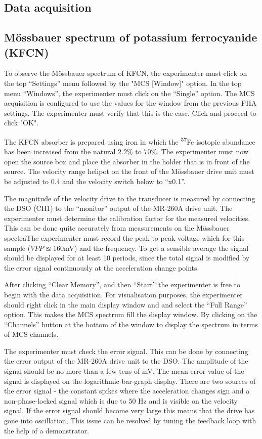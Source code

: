 \documentclass[a4paper, twocolumn]{article}
\begin{document}
\subsection{Data acquisition}
\subsection{Mössbauer spectrum of potassium ferrocyanide (KFCN)}
To observe the Mössbauer spectrum of KFCN, the experimenter must click on the top “Settings” menu followed by the "MCS [Window]" option.
In the top menu “Windows”, the experimenter must click on the “Single” option. The MCS acquisition is configured to use the values for the window from the previous PHA settings\cite{0}. The experimenter must verify that this is the case. Click and proceed to click "OK".

The KFCN absorber is prepared using iron in which the \textsuperscript{57}Fe isotopic abundance has been increased from the natural $2.2\%$ to $70\%$\cite{0}. 
The experimenter must now open the source box and place the absorber in the holder that is in front of the source\cite{0}. The velocity range helipot on the front of the Mössbauer drive unit must be adjusted to 0.4 and the velocity switch below to “x0.1”\cite{0}. 

The magnitude of the velocity drive to the transducer is measured by connecting the DSO (CH1) to the “monitor” output of the MR-260A drive unit\cite{0}. The experimenter must determine the calibration factor for the measured velocities. This can be done quite accurately from measurements on the Mössbauer spectra\cite{0}The experimenter must record the peak-to-peak voltage which for this sample ($VPP \approxeq 160$mV) and the frequency. To get a sensible average the signal should be displayed for at least 10 periods, since the total signal is modified by the error signal continuously at the acceleration change points\cite{0}.

After clicking “Clear Memory”, and then “Start” the experimenter is free to begin with the data acquisition. 
For visualisation purposes, the experimenter should right click in the main display window and and select the “Full Range” option. This makes the MCS spectrum fill the display window. By clicking on the “Channels” button at the bottom of the window to display the spectrum in terms of MCS channels\cite{0}. 

The experimenter must check the error signal. This can be done by connecting the error output of the MR-260A drive unit to the DSO. The amplitude of the signal should be no more than a few tens of mV\cite{0}. The mean error value of the signal is displayed on the logarithmic bar-graph display. There are two sources of the error signal - the constant spikes where the acceleration changes sign and a non-phase-locked signal which is due to 50 Hz and is visible on the velocity signal\cite{0}. If the error signal should become very large this means that the drive has gone into oscillation, This issue can be resolved by tuning the feedback loop with the help of a demonstrator.
\end{document}
